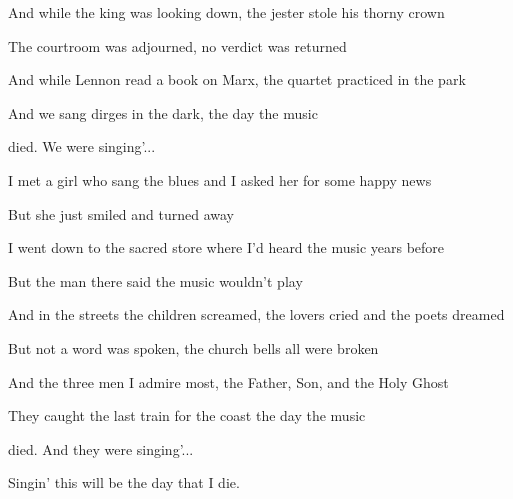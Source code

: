 \begin{song}
\bigskip

And while the king was looking down, the jester stole his thorny crown \par
The courtroom was adjourned, no verdict was returned \par
And while Lennon read a book on Marx, the quartet practiced in the park \par
And we sang dirges in the dark, the day the music \par
{}died.   We were singing'... \par

\bigskip

\Chorus \par

\bigskip

I met a girl who sang the blues and I asked her for some happy news \par
But she just smiled and turned away \par
I went down to the sacred store where I'd heard the music years before \par
But the man there said the music wouldn't play \par

\bigskip

And in the streets the children screamed, the lovers cried and the poets dreamed \par
But not a word was spoken, the church bells all were broken \par
And the three men I admire most, the Father, Son, and the Holy Ghost \par
They caught the last train for the coast the day the music \par
{}died. And they were singing'... \par

\bigskip

\Chorus \par
{} \par
Singin' this will be the day that I die. \par

\end{song}